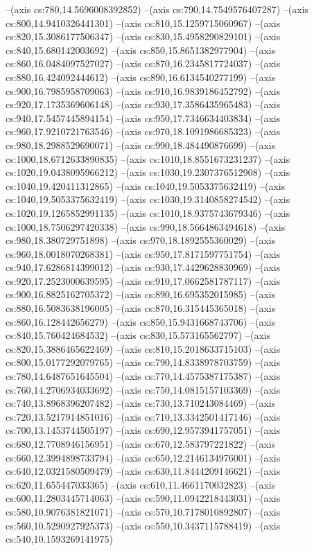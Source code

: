 --(axis cs:780,14.5696008392852)
--(axis cs:790,14.7549576407287)
--(axis cs:800,14.9410326441301)
--(axis cs:810,15.1259715060967)
--(axis cs:820,15.3086177506347)
--(axis cs:830,15.4958290829101)
--(axis cs:840,15.680142003692)
--(axis cs:850,15.8651382977904)
--(axis cs:860,16.0484097527027)
--(axis cs:870,16.2345817724037)
--(axis cs:880,16.424092444612)
--(axis cs:890,16.6134540277199)
--(axis cs:900,16.7985958709063)
--(axis cs:910,16.9839186452792)
--(axis cs:920,17.1735369606148)
--(axis cs:930,17.3586435965483)
--(axis cs:940,17.5457445894154)
--(axis cs:950,17.7346634403834)
--(axis cs:960,17.9210721763546)
--(axis cs:970,18.1091986685323)
--(axis cs:980,18.2988529690071)
--(axis cs:990,18.484490876699)
--(axis cs:1000,18.6712633890835)
--(axis cs:1010,18.8551673231237)
--(axis cs:1020,19.0438095966212)
--(axis cs:1030,19.2307376512908)
--(axis cs:1040,19.420411312865)
--(axis cs:1040,19.5053375632419)
--(axis cs:1040,19.5053375632419)
--(axis cs:1030,19.3140858274542)
--(axis cs:1020,19.1265852991135)
--(axis cs:1010,18.9375743679346)
--(axis cs:1000,18.7506297420338)
--(axis cs:990,18.5664863494618)
--(axis cs:980,18.380729751898)
--(axis cs:970,18.1892555360029)
--(axis cs:960,18.0018070268381)
--(axis cs:950,17.8171597751754)
--(axis cs:940,17.6286814399012)
--(axis cs:930,17.4429628830969)
--(axis cs:920,17.2523000639595)
--(axis cs:910,17.0662581787117)
--(axis cs:900,16.8825162705372)
--(axis cs:890,16.695352015985)
--(axis cs:880,16.5083638196005)
--(axis cs:870,16.315445365018)
--(axis cs:860,16.128442656279)
--(axis cs:850,15.9431668743706)
--(axis cs:840,15.760424684532)
--(axis cs:830,15.573165562797)
--(axis cs:820,15.3886465622469)
--(axis cs:810,15.2018633715103)
--(axis cs:800,15.0177292079765)
--(axis cs:790,14.8338978703759)
--(axis cs:780,14.6487651645504)
--(axis cs:770,14.4575387175387)
--(axis cs:760,14.2706934033692)
--(axis cs:750,14.0815157103369)
--(axis cs:740,13.8968396207482)
--(axis cs:730,13.710243084469)
--(axis cs:720,13.5217914851016)
--(axis cs:710,13.3342501417146)
--(axis cs:700,13.1453744505197)
--(axis cs:690,12.9573941757051)
--(axis cs:680,12.7708946156951)
--(axis cs:670,12.583797221822)
--(axis cs:660,12.3994898733794)
--(axis cs:650,12.2146134976001)
--(axis cs:640,12.0321580509479)
--(axis cs:630,11.8444209146621)
--(axis cs:620,11.655447033365)
--(axis cs:610,11.4661170032823)
--(axis cs:600,11.2803445714063)
--(axis cs:590,11.0942218443031)
--(axis cs:580,10.9076381821071)
--(axis cs:570,10.7178010892807)
--(axis cs:560,10.5290927925373)
--(axis cs:550,10.3437115788419)
--(axis cs:540,10.1593269141975)
